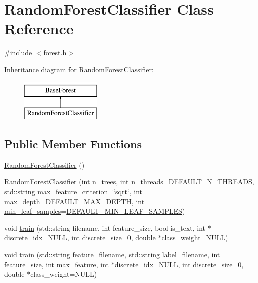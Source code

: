 \hypertarget{class_random_forest_classifier}{\section{Random\+Forest\+Classifier Class Reference}
\label{class_random_forest_classifier}
}


{\ttfamily \#include $<$forest.\+h$>$}

Inheritance diagram for Random\+Forest\+Classifier\+:\begin{figure}[H]
\begin{center}
\leavevmode
\includegraphics[height=2.000000cm]{class_random_forest_classifier}
\end{center}
\end{figure}
\subsection*{Public Member Functions}
\begin{DoxyCompactItemize}
\item 
\hyperlink{class_random_forest_classifier_af10e2093a8e33384ded4aa30b8cbe4e4}{Random\+Forest\+Classifier} ()
\item 
\hyperlink{class_random_forest_classifier_a18ef391e71da976b924013c5c26cbe44}{Random\+Forest\+Classifier} (int \hyperlink{class_base_forest_a2549a0057ec5419fe1de52ef198125ce}{n\+\_\+trees}, int \hyperlink{class_base_forest_a94fe86e1b426d149a11d100921cea3a4}{n\+\_\+threads}=\hyperlink{class_base_forest_a36733c1fadd0daadba8e694ee30fd1b6}{D\+E\+F\+A\+U\+L\+T\+\_\+\+N\+\_\+\+T\+H\+R\+E\+A\+D\+S}, std\+::string \hyperlink{class_base_forest_a5c651ace1f9d5177cdff38a0ae4048f7}{max\+\_\+feature\+\_\+criterion}=\char`\"{}sqrt\char`\"{}, int \hyperlink{class_base_forest_a85cf2e2e202c6e82bf684057181138f6}{max\+\_\+depth}=\hyperlink{class_base_forest_ac6df44eee4d7ee5913ad57d1d6c79692}{D\+E\+F\+A\+U\+L\+T\+\_\+\+M\+A\+X\+\_\+\+D\+E\+P\+T\+H}, int \hyperlink{class_base_forest_a15e0407f3c0fbc4c25e0796c781ff059}{min\+\_\+leaf\+\_\+samples}=\hyperlink{class_base_forest_a3d000d7f9e2410c73b41b70d8e2e58f8}{D\+E\+F\+A\+U\+L\+T\+\_\+\+M\+I\+N\+\_\+\+L\+E\+A\+F\+\_\+\+S\+A\+M\+P\+L\+E\+S})
\item 
void \hyperlink{class_random_forest_classifier_a07680b59615bb765843e3eec4139365e}{train} (std\+::string filename, int feature\+\_\+size, bool is\+\_\+text, int $\ast$discrete\+\_\+idx=N\+U\+L\+L, int discrete\+\_\+size=0, double $\ast$class\+\_\+weight=N\+U\+L\+L)
\item 
void \hyperlink{class_random_forest_classifier_a8a397b32e0f6ba43ecfb669ed9bc07e5}{train} (std\+::string feature\+\_\+filename, std\+::string label\+\_\+filename, int feature\+\_\+size, int \hyperlink{class_base_forest_a07e8b0ed27405f469198f2c4875786c9}{max\+\_\+feature}, int $\ast$discrete\+\_\+idx=N\+U\+L\+L, int discrete\+\_\+size=0, double $\ast$class\+\_\+weight=N\+U\+L\+L)
\end{DoxyCompactItemize}

